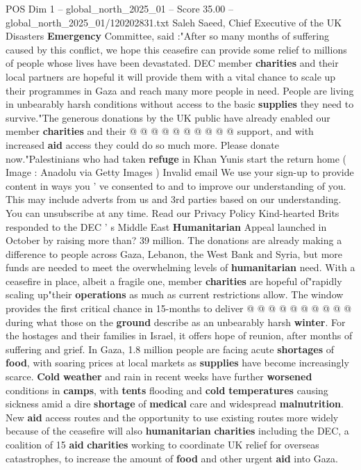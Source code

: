 \begin{textsample}{POS Dim 1 – global\_north\_2025\_01 – Score 35.00 – global\_north\_2025\_01/120202831.txt}
Saleh Saeed, Chief Executive of the UK Disasters \textbf{Emergency} Committee, said :"After so many months of suffering caused by this conflict, we hope this ceasefire can provide some relief to millions of people whose lives have been devastated.
DEC member \textbf{charities} and their local partners are hopeful it will provide them with a vital chance to scale up their programmes in Gaza and reach many more people in need.
People are living in unbearably harsh conditions without access to the basic \textbf{supplies} they need to survive."The generous donations by the UK public have already enabled our member \textbf{charities} and their @ @ @ @ @ @ @ @ @ @ support, and with increased \textbf{aid} access they could do so much more.
Please donate now."Palestinians who had taken \textbf{refuge} in Khan Yunis start the return home ( Image : Anadolu via Getty Images ) Invalid email We use your sign-up to provide content in ways you ' ve consented to and to improve our understanding of you.
This may include adverts from us and 3rd parties based on our understanding.
You can unsubscribe at any time.
Read our Privacy Policy Kind-hearted Brits responded to the DEC ' s Middle East \textbf{Humanitarian} Appeal launched in October by raising more than? 39 million.
The donations are already making a difference to people across Gaza, Lebanon, the West Bank and Syria, but more funds are needed to meet the overwhelming levels of \textbf{humanitarian} need.
With a ceasefire in place, albeit a fragile one, member \textbf{charities} are hopeful of"rapidly scaling up"their \textbf{operations} as much as current restrictions allow.
The window provides the first critical chance in 15-months to deliver @ @ @ @ @ @ @ @ @ @ during what those on the \textbf{ground} describe as an unbearably harsh \textbf{winter}.
For the hostages and their families in Israel, it offers hope of reunion, after months of suffering and grief.
In Gaza, 1.8 million people are facing acute \textbf{shortages} of \textbf{food}, with soaring prices at local markets as \textbf{supplies} have become increasingly scarce. \textbf{Cold} \textbf{weather} and rain in recent weeks have further \textbf{worsened} conditions in \textbf{camps}, with \textbf{tents} flooding and \textbf{cold} \textbf{temperatures} causing sickness amid a dire \textbf{shortage} of \textbf{medical} care and widespread \textbf{malnutrition}.
New \textbf{aid} access routes and the opportunity to use existing routes more widely because of the ceasefire will also \textbf{humanitarian} \textbf{charities} including the DEC, a coalition of 15 \textbf{aid} \textbf{charities} working to coordinate UK relief for overseas catastrophes, to increase the amount of \textbf{food} and other urgent \textbf{aid} into Gaza.

\end{textsample}
